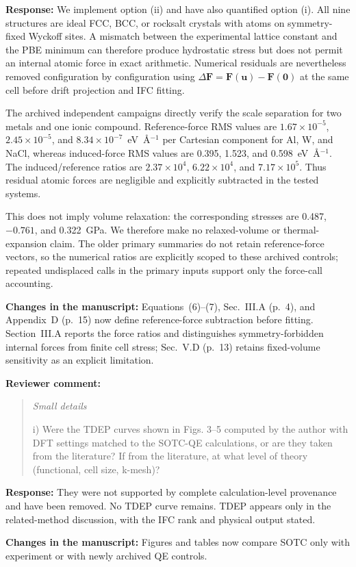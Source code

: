 \documentclass[11pt]{article}
\newcommand{\Question}[1]{\par\medskip\noindent\textbf{Reviewer comment:}\par\begin{quote}\itshape #1\end{quote}}
\newcommand{\Answer}[1]{\par\noindent\color{black}\normalfont\textbf{Response:} #1\par\smallskip}
\newcommand{\Change}[1]{\par\noindent\color{revisionblue}\normalfont\textbf{Changes in the manuscript:} #1\par\color{black}\medskip}
\begin{document}
\Answer{We implement option (ii) and have also quantified option (i).
All nine structures are ideal FCC, BCC, or rocksalt crystals with atoms on
symmetry-fixed Wyckoff sites. A mismatch between the experimental lattice
constant and the PBE minimum can therefore produce hydrostatic stress but does
not permit an internal atomic force in exact arithmetic. Numerical residuals
are nevertheless removed configuration by configuration using
$\Delta\mathbf F=\mathbf F(\mathbf u)-\mathbf F(\mathbf0)$ at the same cell
before drift projection and IFC fitting.

The archived independent campaigns directly verify the scale separation for
two metals and one ionic compound. Reference-force RMS values are
$1.67\times10^{-5}$, $2.45\times10^{-5}$, and
$8.34\times10^{-7}$~eV~\AA$^{-1}$ per Cartesian component for Al, W, and
NaCl, whereas induced-force RMS values are 0.395, 1.523, and
0.598~eV~\AA$^{-1}$. The induced/reference ratios are
$2.37\times10^4$, $6.22\times10^4$, and $7.17\times10^5$.
Thus residual atomic forces are negligible and explicitly subtracted in the
tested systems.

This does not imply volume relaxation: the corresponding stresses are 0.487,
$-0.761$, and 0.322~GPa. We therefore make no relaxed-volume or thermal-expansion
claim. The older primary summaries do not retain reference-force vectors, so
the numerical ratios are explicitly scoped to these archived controls; repeated
undisplaced calls in the primary inputs support only the force-call accounting.}

\Change{Equations~(6)--(7), Sec.~III.A (p.~4), and Appendix~D (p.~15)
now define reference-force subtraction before fitting. Section~III.A reports
the force ratios and distinguishes symmetry-forbidden internal forces from
finite cell stress; Sec.~V.D (p.~13) retains fixed-volume sensitivity as an
explicit limitation.}

\Question{Small details

i) Were the TDEP curves shown in Figs. 3--5 computed by the author with DFT settings matched to the SOTC-QE calculations, or are they taken from the literature? If from the literature, at what level of theory (functional, cell size, k-mesh)?}

\Answer{They were not supported by complete calculation-level provenance and have been removed. No TDEP curve remains. TDEP appears only in the related-method discussion, with the IFC rank and physical output stated.}

\Change{Figures and tables now compare SOTC only with experiment or with newly archived QE controls.}
\end{document}
